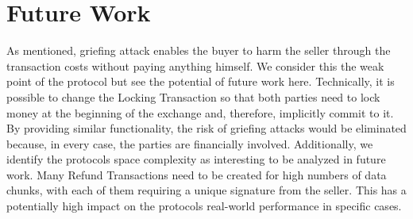 \documentclass{cacthesis}
\newcounter{protocol}
\begin{document}
    \section{Future Work}
    As mentioned, griefing attack enables the buyer to harm the seller through the transaction costs without paying anything himself. We consider this the weak point of the protocol but see the potential of future work here. Technically, it is possible to change the Locking Transaction so that both parties need to lock money at the beginning of the exchange and, therefore, implicitly commit to it. By providing similar functionality, the risk of griefing attacks would be eliminated because, in every case, the parties are financially involved. Additionally, we identify the protocols space complexity as interesting to be analyzed in future work. Many Refund Transactions need to be created for high numbers of data chunks, with each of them requiring a unique signature from the seller. This has a potentially high impact on the protocols real-world performance in specific cases.
 
    
	
	\newpage
    
    
	
	\appendix
\end{document}
